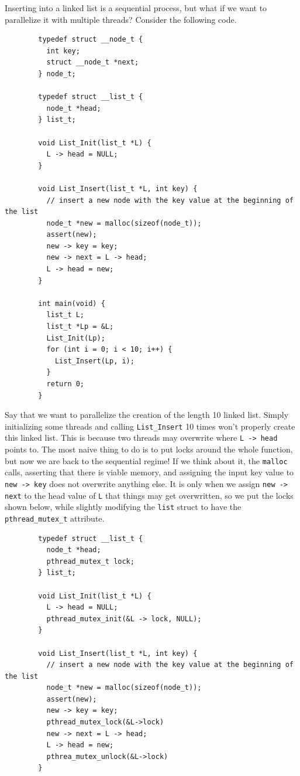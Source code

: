 \documentclass{article}
\newcounter{example}[section]
\newcounter{code}[section]
\begin{document}
    \begin{example}
      \label{ex:inserting-into-linked-list}
      Inserting into a linked list is a sequential process, but what if we want to parallelize it with multiple threads? Consider the following code. 
      \begin{lstlisting}
        typedef struct __node_t {
          int key; 
          struct __node_t *next; 
        } node_t; 

        typedef struct __list_t {
          node_t *head; 
        } list_t; 

        void List_Init(list_t *L) {
          L -> head = NULL; 
        }

        void List_Insert(list_t *L, int key) {
          // insert a new node with the key value at the beginning of the list 
          node_t *new = malloc(sizeof(node_t)); 
          assert(new); 
          new -> key = key; 
          new -> next = L -> head; 
          L -> head = new; 
        }

        int main(void) {
          list_t L; 
          list_t *Lp = &L; 
          List_Init(Lp); 
          for (int i = 0; i < 10; i++) {
            List_Insert(Lp, i); 
          }
          return 0; 
        }
      \end{lstlisting}
      Say that we want to parallelize the creation of the length 10 linked list. Simply initializing some threads and calling \texttt{List\_Insert} 10 times won't properly create this linked list. This is because two threads may overwrite where \texttt{L -> head} points to. The most naive thing to do is to put locks around the whole function, but now we are back to the sequential regime! If we think about it, the \texttt{malloc} calls, asserting that there is viable memory, and assigning the input key value to \texttt{new -> key} does not overwrite anything else. It is only when we assign \texttt{new -> next} to the head value of \texttt{L} that things may get overwritten, so we put the locks shown below, while slightly modifying the \texttt{list} struct to have the \texttt{pthread\_mutex\_t} attribute. 
      \begin{lstlisting}
        typedef struct __list_t {
          node_t *head; 
          pthread_mutex_t lock; 
        } list_t; 

        void List_Init(list_t *L) {
          L -> head = NULL; 
          pthread_mutex_init(&L -> lock, NULL); 
        }

        void List_Insert(list_t *L, int key) {
          // insert a new node with the key value at the beginning of the list 
          node_t *new = malloc(sizeof(node_t)); 
          assert(new); 
          new -> key = key; 
          pthread_mutex_lock(&L->lock)
          new -> next = L -> head; 
          L -> head = new; 
          pthrea_mutex_unlock(&L->lock)
        }
      \end{lstlisting}
    \end{example}
\end{document}
